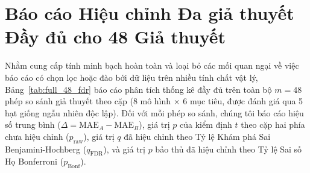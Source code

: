 \documentclass[10pt,twocolumn,letterpaper]{article}
\begin{document}



\clearpage
\appendix
\section{Báo cáo Hiệu chỉnh Đa giả thuyết Đầy đủ cho 48 Giả thuyết}
\label{sec:appendix_fdr}

Nhằm cung cấp tính minh bạch hoàn toàn và loại bỏ các mối quan ngại về việc báo cáo có chọn lọc hoặc đào bới dữ liệu trên nhiều tính chất vật lý, Bảng~\ref{tab:full_48_fdr} báo cáo phân tích thống kê đầy đủ trên toàn bộ $m = 48$ phép so sánh giả thuyết theo cặp ($8$ mô hình $\times$ $6$ mục tiêu, được đánh giá qua 5 hạt giống ngẫu nhiên độc lập). Đối với mỗi phép so sánh, chúng tôi báo cáo hiệu số trung bình ($\Delta = \text{MAE}_A - \text{MAE}_B$), giá trị $p$ của kiểm định $t$ theo cặp hai phía chưa hiệu chỉnh ($p_{\mathrm{raw}}$), giá trị $q$ đã hiệu chỉnh theo Tỷ lệ Khám phá Sai Benjamini-Hochberg ($q_{\mathrm{FDR}}$), và giá trị $p$ bảo thủ đã hiệu chỉnh theo Tỷ lệ Sai số Họ Bonferroni ($p_{\mathrm{Bonf}}$).


\end{document}
